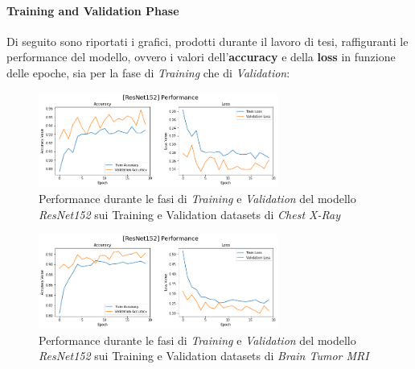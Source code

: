         \paragraph{Training and Validation Phase} 
        Di seguito sono riportati i grafici, prodotti durante il lavoro di tesi, raffiguranti le performance del modello, ovvero i valori dell'\textbf{accuracy} e della \textbf{loss} in funzione delle epoche, sia per la fase di \textit{Training} che di \textit{Validation}:
            \begin{figure}[!h]
                \centering
                \includegraphics[width=0.7\textwidth]{Images/Modelli/ResNet152/ResNet152 Pneumonia Performance.png}
                \caption{Performance durante le fasi di \textit{Training} e \textit{Validation} del modello \textit{ResNet152} sui Training e Validation datasets di \textit{Chest X-Ray}}
                \label{ResNet152 Pneumonia Performance}
            \end{figure}
            
            \begin{figure}[!h]
                \centering
                \includegraphics [width=0.7\textwidth]{Images/Modelli/ResNet152/ResNet152 Brain Performance.png}
                \caption{Performance durante le fasi di \textit{Training} e \textit{Validation} del modello \textit{ResNet152} sui Training e Validation datasets di \textit{Brain Tumor MRI}}
                \label{ResNet152 Brain Performance}
            \end{figure}
        
